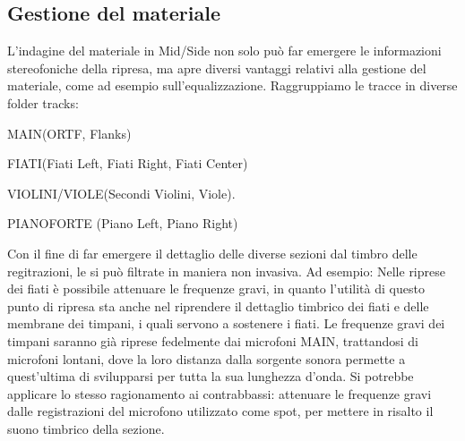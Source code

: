 \subsection*{Gestione del materiale}
L'indagine del materiale in Mid/Side non solo può far emergere le informazioni stereofoniche della ripresa, ma apre diversi vantaggi relativi alla gestione del materiale, come ad esempio sull'equalizzazione. Raggruppiamo le tracce in diverse folder tracks:
\begin{compactitem} 
	\item MAIN(ORTF, Flanks)
	\item FIATI(Fiati Left, Fiati Right, Fiati Center)
	\item VIOLINI/VIOLE(Secondi Violini, Viole).
	\item PIANOFORTE (Piano Left, Piano Right)
	\end{compactitem}
Con il fine di far emergere il dettaglio delle diverse sezioni dal timbro delle regitrazioni, le si può filtrate  in maniera non invasiva.
Ad esempio: Nelle riprese dei fiati è possibile attenuare le frequenze gravi, in quanto l'utilità di questo punto di ripresa sta anche nel riprendere il dettaglio timbrico dei fiati e delle membrane dei timpani, i quali servono a sostenere i fiati. Le frequenze gravi dei timpani saranno già riprese fedelmente dai microfoni MAIN, trattandosi di microfoni lontani, dove la loro distanza dalla sorgente sonora permette a quest'ultima di svilupparsi per tutta la sua lunghezza d'onda.
Si potrebbe applicare lo stesso ragionamento ai contrabbassi: attenuare le frequenze gravi dalle registrazioni del microfono utilizzato come spot, per mettere in risalto il suono timbrico della sezione.


\vfill\null

\newpage %


\vfill\null

\raggedright
%



